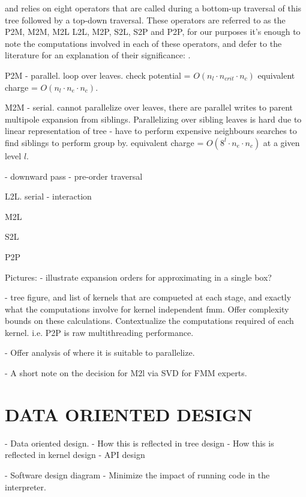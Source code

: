 \documentclass{IEEEcsmag}
\begin{document}
and relies on eight operators that are called during a bottom-up traversal of this tree followed by a top-down traversal. These operators are referred to as the P2M, M2M, M2L L2L, M2P, S2L, S2P and P2P, for our purposes it's enough to note the computations involved in each of these operators, and defer to the literature for an explanation of their significance: \cite{Ying2004,Greengard1987,Lashuk2012}.


P2M
- parallel. loop over leaves. check potential = $O(n_l \cdot n_{crit} \cdot n_c)$ equivalent charge = $O(n_l \cdot n_e \cdot  n_c)$.

M2M
- serial. cannot parallelize over leaves, there are parallel writes to parent multipole expansion from siblings. Parallelizing over sibling leaves is hard due to linear representation of tree - have to perform expensive neighbours searches to find siblings to perform group by. equivalent charge = $O(8^l \cdot n_e \cdot n_c)$ at a given level $l$.

- downward pass - pre-order traversal

L2L. serial - interaction

M2L

S2L

P2P

Pictures:
- illustrate expansion orders for approximating in a single box?

- tree figure, and list of kernels that are compueted at each stage, and exactly what the computations involve for kernel independent fmm. Offer complexity bounds on these calculations. Contextualize the computations required of each kernel. i.e. P2P is raw multithreading performance.

- Offer analysis of where it is suitable to parallelize.

- A short note on the decision for M2l via SVD for FMM experts.

\section{DATA ORIENTED DESIGN}

- Data oriented design.
- How this is reflected in tree design
- How this is reflected in kernel design
- API design

- Software design diagram
- Minimize the impact of running code in the interpreter.
\end{document}
